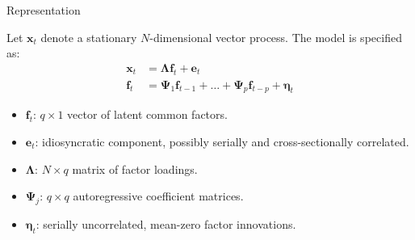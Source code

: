 \documentclass{beamer}
\begin{document}
\begin{frame}{Representation}


Let $\boldsymbol{x}_t$ denote a stationary $N$-dimensional vector process. The model is specified as:
\begin{align*}
    \boldsymbol{x}_t &= \boldsymbol{\Lambda} \boldsymbol{f}_t + \boldsymbol{e}_t \\
    \boldsymbol{f}_t &= \boldsymbol{\Psi}_1 \boldsymbol{f}_{t-1} + \dots + \boldsymbol{\Psi}_p \boldsymbol{f}_{t-p} + \boldsymbol{\eta}_t
\end{align*}

\begin{itemize}
    \item $\boldsymbol{f}_t$: $q \times 1$ vector of latent common factors.
    \item $\boldsymbol{e}_t$: idiosyncratic component, possibly serially and cross-sectionally correlated.
    \item $\boldsymbol{\Lambda}$: $N \times q$ matrix of factor loadings.
    \item $\boldsymbol{\Psi}_j$: $q \times q$ autoregressive coefficient matrices.
    \item $\boldsymbol{\eta}_t$: serially uncorrelated, mean-zero factor innovations.
\end{itemize}

\end{frame}
\end{document}
